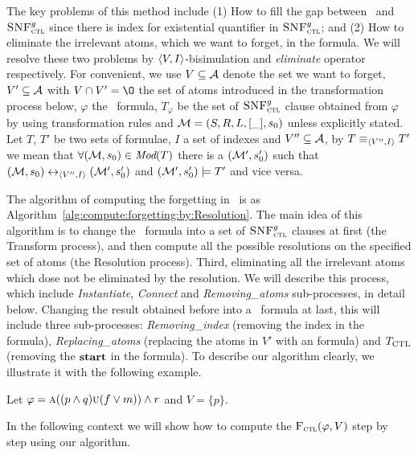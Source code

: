 \documentclass[letterpaper]{article} %
\begin{document}
The key problems of this method include (1) How to fill the gap between \CTL\ and ${\textsc{SNF}_{\textsc{ctl}}^g}$ since there is index for existential quantifier in ${\textsc{SNF}_{\textsc{ctl}}^g}$; and (2) How to eliminate the irrelevant atoms, which we want to forget, in the formula.
We will resolve these two problems by ${\langle{V,I}\rangle}$-bisimulation and \emph{eliminate} operator respectively.
For convenient, we use $V\subseteq {\cal A}$ denote the set we want to forget, $V' \subseteq {\cal A}$ with $V \cap V'={\O}$ the set of atoms introduced in the transformation process below, $\varphi$  the \CTL\ formula, $T_{\varphi}$ be the set of ${\textsc{SNF}_{\textsc{ctl}}^g}$ clause obtained from $\varphi$ by using transformation rules  and ${\cal M}=(S,R,L,[\_], s_0)$ unless explicitly stated.
 Let $T$, $T'$ be two sets of formulae, $I$ a set of indexes and $V''\subseteq {\cal A}$, by $T\equiv_{{\langle{V'', I}\rangle}} T'$ we mean that $\forall ({\cal M}, s_0) \in \textit{Mod}(T)$ there is a $({\cal M}', s_0')$ such that $({\cal M},s_0) \leftrightarrow_{{\langle{V'', I}\rangle}} ({\cal M}',s_0')$ and $({\cal M}', s_0') \models T'$ and vice versa.







The algorithm of computing the forgetting in \CTL\ is as Algorithm~\ref{alg:compute:forgetting:by:Resolution}.
The main idea of this algorithm is to change the \CTL\ formula into a set of ${\textsc{SNF}_{\textsc{ctl}}^g}$ clauses at first (the Transform process), and then compute all the possible resolutions on the specified set of atoms (the Resolution process). Third, eliminating all the irrelevant atoms which dose not be eliminated by the resolution. We will describe this process, which include \emph{Instantiate}, \emph{Connect} and \emph{Removing\_atoms} sub-processes, in detail below.
Changing the result obtained before into a \CTL\ formula at last, this will include three sub-processes: \emph{Removing\_index} (removing the index in the formula), \emph{Replacing\_atoms} (replacing the atoms in $V'$ with an formula) and $T_{\textrm{CTL}}$ (removing the $\textbf{start}$ in the formula).
To describe our algorithm clearly, we illustrate it with the following example.
\begin{example}\label{main:examp}
Let $\varphi=\textsc{a}((p\wedge q) \textsc{u} (f\vee m)) \wedge r$ and $V=\{p\}$.
\end{example}
In the following context we will show how to compute the ${\textsc{F}_{\textsc{ctl}}}(\varphi, V)$ step by step using our algorithm.
\end{document}
